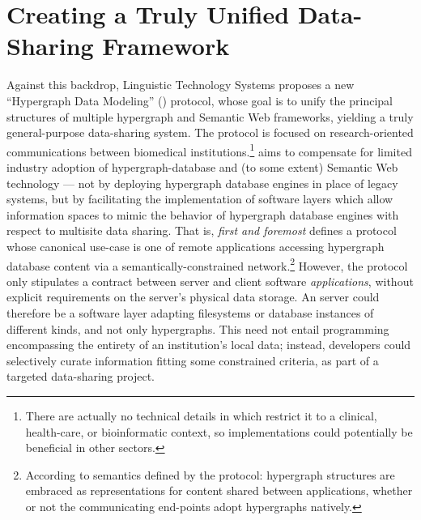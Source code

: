 \documentclass[12pt,letterpaper]{article}
\newcommand{\HGDM}{\resizebox{!}{7.5pt}{\ATexttclr{HGDM}}}
\newcommand{\lHGDM}{\resizebox{!}{8.5pt}{\ATexttclr{H}}%
\resizebox{!}{7.5pt}{\ATexttclr{GDM}}}
\newcommand{\sHGDM}{\resizebox{!}{6.5pt}{\ATexttclr{H}}%
\resizebox{!}{6.5pt}{\ATexttclr{GDM}}}
\newcommand{\ATexttclr}[1]{\textcolor{tcolor}{\textbf{#1}}}
\newcommand{\p}[1]{

\vspace{.7em}#1}
\newcommand{\q}[1]{{\fontfamily{qcr}\selectfont ``}#1{\fontfamily{qcr}\selectfont ''}}
\begin{document}
{\section{Creating a Truly Unified Data-Sharing Framework}
\p{Against this backdrop, Linguistic Technology Systems 
proposes a new \q{Hypergraph Data Modeling} 
(\HGDM{}) protocol, whose goal is to unify the principal structures 
of multiple hypergraph and Semantic Web frameworks, yielding a 
truly general-purpose data-sharing system.  The \HGDM{} protocol is 
focused on research-oriented communications between biomedical 
institutions.\footnote{There are actually no technical details in \sHGDM{} 
which restrict it to a clinical, health-care, or bioinformatic context, 
so implementations could potentially be beneficial in other sectors.}  
\lHGDM{} aims to compensate for limited industry adoption of 
hypergraph-database and (to some extent) Semantic Web technology 
--- not by deploying hypergraph database engines in place of 
legacy systems, but by facilitating the implementation of software 
layers which allow information spaces to mimic the behavior 
of hypergraph database engines with respect to multisite data 
sharing.  That is, \HGDM{} \textit{first and foremost} 
defines a protocol whose canonical 
use-case is one of remote applications accessing hypergraph 
database content via a semantically-constrained network.\footnote{According 
to semantics defined by the protocol: hypergraph structures 
are embraced as representations for content 
shared between applications, whether or not the 
communicating end-points adopt hypergraphs natively.}  However, the protocol 
only stipulates a contract between server and client software 
\textit{applications}, without explicit requirements on the server's 
physical data storage.  An \HGDM{} server could therefore be a 
software layer adapting filesystems or database instances of different 
kinds, and not only hypergraphs.  This need not entail  
programming encompassing the entirety of an institution's local data; 
instead, developers could selectively curate information fitting 
some constrained criteria, as part of a targeted data-sharing project.}

}
\end{document}
